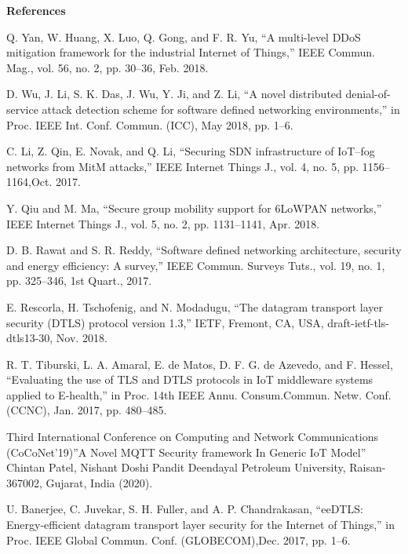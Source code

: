 \documentclass[12pt,a4paper,twocolumn,fleqn]{article}
\begin{document}
\newpage
  \pagestyle{fancy}
  \thispagestyle{empty}
  \thispagestyle{plain}
  \fancyhf{}
  \chead{}
\renewcommand{\footrulewidth}{0.4pt}%
\normalsize
\LARGE{\textbf{References}} 
\normalsize
\let\lbrack[
\let\rbrack]
\begin{enumerate}[\lbrack1{\rbrack}]
    \item Q. Yan, W. Huang, X. Luo, Q. Gong, and F. R. Yu, “A multi-level DDoS mitigation framework for the industrial Internet of Things,” IEEE Commun. Mag., vol. 56, no. 2, pp. 30–36, Feb. 2018.
    \item  D. Wu, J. Li, S. K. Das, J. Wu, Y. Ji, and Z. Li, “A novel distributed denial-of-service attack detection scheme for software defined networking environments,” in Proc. IEEE Int. Conf. Commun. (ICC), May 2018, pp. 1–6.
    \item C. Li, Z. Qin, E. Novak, and Q. Li, “Securing SDN infrastructure of IoT–fog networks from MitM attacks,” IEEE Internet Things J., vol. 4, no. 5, pp. 1156–1164,Oct. 2017.
    \item Y. Qiu and M. Ma, “Secure group mobility support for 6LoWPAN networks,” IEEE Internet Things J., vol. 5, no. 2, pp. 1131–1141, Apr. 2018.
    \item  D. B. Rawat and S. R. Reddy, “Software defined networking architecture, security and energy efficiency: A survey,” IEEE Commun. Surveys Tuts., vol. 19, no. 1, pp. 325–346, 1st Quart., 2017.
    \item E. Rescorla, H. Tschofenig, and N. Modadugu, “The datagram transport layer security (DTLS) protocol  version 1.3,” IETF, Fremont, CA, USA, draft-ietf-tls- dtls13-30, Nov. 2018. 
    \item  R. T. Tiburski, L. A. Amaral, E. de Matos, D. F. G. de Azevedo, and F. Hessel, “Evaluating the use of TLS and DTLS protocols in IoT middleware systems applied to E-health,” in Proc. 14th IEEE Annu. Consum.Commun. Netw. Conf. (CCNC), Jan. 2017, pp. 480–485.
    \item Third International Conference on Computing and Network Communications (CoCoNet’19)”A Novel MQTT Security framework In Generic IoT Model” Chintan Patel, Nishant Doshi Pandit Deendayal Petroleum University, Raisan-367002, Gujarat, India (2020).
    \item  U. Banerjee, C. Juvekar, S. H. Fuller, and A. P. Chandrakasan, “eeDTLS: Energy-efficient datagram transport layer security for the Internet of Things,” in Proc. IEEE Global Commun. Conf. (GLOBECOM),Dec. 2017, pp. 1–6. 

\end{enumerate}
\end{document}
